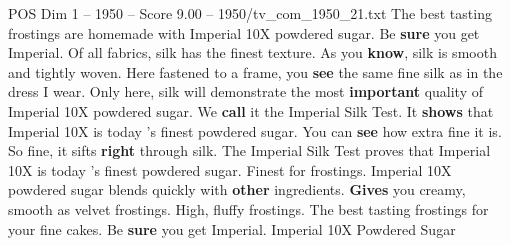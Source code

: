 \begin{textsample}{POS Dim 1 – 1950 – Score 9.00 – 1950/tv\_com\_1950\_21.txt}  \label{ex:f1_pos_010}
The best tasting frostings are homemade with Imperial 10X powdered sugar.
Be \textbf{sure} you get Imperial.
Of all fabrics, silk has the finest texture.
As you \textbf{know}, silk is smooth and tightly woven.
Here fastened to a frame, you \textbf{see} the same fine silk as in the dress I wear.
Only here, silk will demonstrate the most \textbf{important} quality of Imperial 10X powdered sugar.
We \textbf{call} it the Imperial Silk Test.
It \textbf{shows} that Imperial 10X is today 's finest powdered sugar.
You can \textbf{see} how extra fine it is.
So fine, it sifts \textbf{right} through silk.
The Imperial Silk Test proves that Imperial 10X is today 's finest powdered sugar.
Finest for frostings.
Imperial 10X powdered sugar blends quickly with \textbf{other} ingredients. \textbf{Gives} you creamy, smooth as velvet frostings.
High, fluffy frostings.
The best tasting frostings for your fine cakes.
Be \textbf{sure} you get Imperial.
Imperial 10X Powdered Sugar

\end{textsample}

